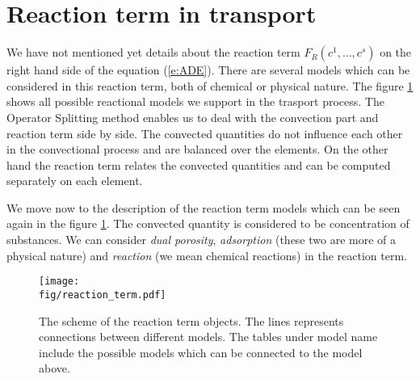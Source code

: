 \def\abs#1{\lvert#1\rvert}
\def\argdot{{\hspace{0.18em}\cdot\hspace{0.18em}}}
\def\avg#1{\left\{#1\right\}_\omega}
\def\D{{\tn D}}
\def\div{\operatorname{div}}
\def\Eh{\mathcal E_h}       %
\def\Ehcom{\mathcal E_{h,C}}         %
\def\Ehdir{\mathcal E_{h,D}}         %
\def\Ehint{\mathcal E_{h,I}}       %
\def\grad{\nabla}
\def\jmp#1{[#1]}
\def\n{\vc n}
\def\vc#1{\mathbf{\boldsymbol{#1}}}     %
\def\R{\mathbb R}
\def\sc#1#2{\left(#1,#2\right)}
\def\Th{\mathcal T_h}       %
\def\th{\vartheta}
\def\tn#1{{\mathbb{#1}}}    %
\def\Tr{\operatorname{Tr}}
\def\where{\,|\,}

\section{Reaction term in transport}
\label{sec:reaction_term}

We have not mentioned yet details about the reaction term $F_R(c^1,\ldots,c^s)$ on the right hand side of the equation (\ref{e:ADE}).
There are several models which can be considered in this reaction term, both of chemical or physical nature. 
The figure \ref{fig:reaction_term} shows all possible reactional models we support in the trasport process. The Operator Splitting method enables 
us to deal with the convection part and reaction term side by side. The convected quantities do not influence each other in the convectional
process and are balanced over the elements. On the other hand the reaction term relates the convected quantities and can be computed 
separately on each element.

We move now to the description of the reaction term models which can be seen again in the figure \ref{fig:reaction_term}. 
The convected quantity is considered to be concentration of substances. 
We can consider \emph{dual porosity}, \emph{adsorption} (these two are more of a physical nature) and \emph{reaction} (we mean chemical 
reactions) in the reaction term. 

\begin{figure}
  \centering
  \texttt{[image: \\fig/reaction\_term.pdf]}
  \caption{The scheme of the reaction term objects. The lines represents connections between different models. 
  The tables under model name include the possible models which can be connected to the model above.}
  \label{fig:reaction_term}
\end{figure}


